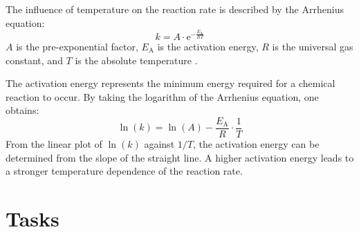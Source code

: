 The influence of temperature on the reaction rate is described by the Arrhenius equation:
\begin{equation}
k = A \cdot \mathrm{e}^{-\frac{E_{\text{A}}}{R T}}
\end{equation}
$A$ is the pre-exponential factor, $E_{\text{A}}$ is the activation energy, $R$ is the universal gas constant, and $T$ is the absolute temperature \citep{sulciute_kinetics_theory}.

The activation energy represents the minimum energy required for a chemical reaction to occur. By taking the logarithm of the Arrhenius equation, one obtains:
\begin{equation}
\ln(k) = \ln(A) - \frac{E_{\text{A}}}{R} \cdot \frac{1}{T}
\end{equation}
From the linear plot of $\ln(k)$ against $1/T$, the activation energy can be determined from the slope of the straight line. A higher activation energy leads to a stronger temperature dependence of the reaction rate.

\section{Tasks}

